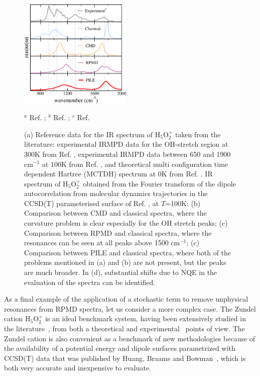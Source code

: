 \documentclass[aps,prb,superscriptaddress,amsmath,amssymb,showpacs,twocolumn]{revtex4}
\begin{document}
\begin{figure}[htbp]
\begin{center}
\includegraphics[width=0.48\textwidth]{figures/zundel_lowfreq_100K.pdf}
\end{center}
{\small {}$^a$ Ref. \cite{YehLee1989}; {}$^b$ Ref. \cite{AsmisScience2003}; {}$^c$ Ref. \cite{VendrellMeyer2007}}
\caption{(a) Reference data for the IR spectrum of H$_5$O$_2^+$ taken from the literature: experimental
IRMPD data for the OH-stretch region at 300K from Ref. \cite{YehLee1989}, experimental IRMPD data between 650 and 1900 cm$^{-1}$ 
at 100K from Ref. \cite{AsmisScience2003}, and theoretical multi configuration time dependent Hartree (MCTDH) spectrum at 0K from Ref. \cite{VendrellMeyer2007}.
IR spectrum of H$_5$O$_2^+$ obtained from the Fourier transform of the dipole autocorrelation from molecular 
dynamics trajectories in the CCSD(T) parameterised surface of Ref. \cite{HuangBraamsBowman2005}, at $T$=100K: 
(b) Comparison between CMD and classical spectra, where the curvature problem is clear especially for the OH stretch peaks; 
(c) Comparison between RPMD and classical spectra, where the resonances can be seen at all peaks above 1500 cm$^{-1}$; (c)
Comparison between PILE and classical spectra, where both of the problems mentioned in (a) and (b) are not present, but the peaks
are much broader. In (d), substantial shifts due to NQE in the evaluation of the spectra can be identified.}
\label{fig:zundel-spectra}
\end{figure}

As a final example of the application of a stochastic term to remove unphysical resonances 
from RPMD spectra, let us consider a more complex case. The Zundel cation H$_5$O$_2^+$ 
is an ideal benchmark system, having been 
extensively studied in the literature~\cite{Schatteburg2008}, from both a theoretical
\cite{AgostiniCiccotti2011, ParkKim2007, VenerSauer2001, SauerDoebler2005, ChengKrause1997, VendrellMeyer2007, 
BaerMarxMathias2010, KaledinBowmanJordan2009, HuangBraamsBowman2005} 
and experimental~\cite{YehLee1989, GuascoJohnson2011, AsmisScience2003, HammerBowmanCarter2005, FridgenMaitre2004}
points of view. The Zundel cation is also convenient as a benchmark of new methodologies
because of the availability of a potential energy and dipole surfaces parametrized
with CCSD(T) data that was published by Huang, Braams and Bowman~\cite{HuangBraamsBowman2005},
which is both very accurate and inexpensive to evaluate. 
\end{document}
